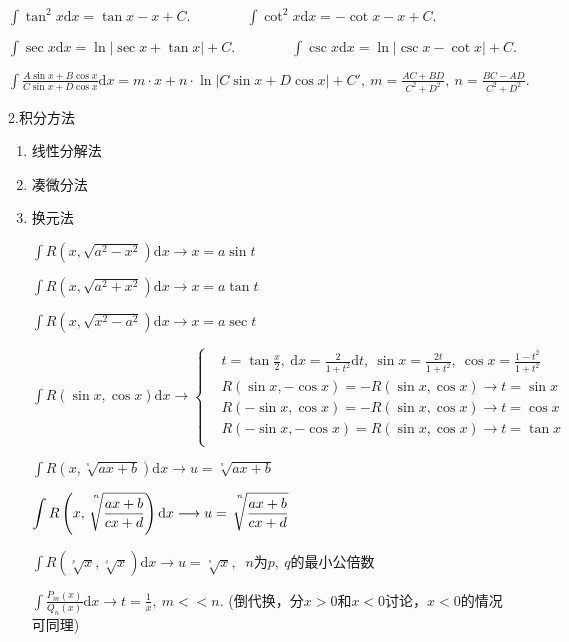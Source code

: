\documentclass[UTF8]{ctexart}
\newcommand\dif{\mathrm{d}}
\newcommand\no{\noindent}
\newcommand\dis{\displaystyle}
\newcommand\intd{\dis\int}
\begin{document}
\begin{spacing}{2}
\begin{spacing}{3}
$\intd\tan^2 x\dif x=\tan x-x+C.
\qquad\qquad
\intd\cot^2 x\dif x=-\cot x-x+C.$

$\intd \sec x\dif x=\ln|\sec x+\tan x|+C.
\qquad\qquad
\intd\csc x\dif x=\ln|\csc x-\cot x|+C.$

$\intd\frac{A\sin x+B\cos x}{C\sin x+D\cos x}\dif x
=m\cdot x+n\cdot \ln|C\sin x+D\cos x|+C',\ 
m=\frac{AC+BD}{C^2+D^2},\ n=\frac{BC-AD}{C^2+D^2}.$

\end{spacing}

\no2.积分方法

\begin{enumerate}[itemindent=1.4em, label=(\arabic*)]

\item 线性分解法

\item 凑微分法

\item 换元法

$\intd R(x,\sqrt{a^2-x^2})\dif x\longrightarrow x=a\sin t$

$\intd R(x,\sqrt{a^2+x^2})\dif x\longrightarrow x=a\tan t$

$\intd R(x,\sqrt{x^2-a^2})\dif x\longrightarrow x=a\sec t$

$\intd R(\sin x,\cos x)\dif x\longrightarrow 
\left\{\begin{aligned}
&t=\tan\frac{x}{2},\ 
\dif x=\frac{2}{1+t^2}\dif t,\ \sin x=\frac{2t}{1+t^2},\ 
\cos x=\frac{1-t^2}{1+t^2}\\
&R(\sin x,-\cos x)=-R(\sin x,\cos x)\longrightarrow t=\sin x\\
&R(-\sin x,\cos x)=-R(\sin x,\cos x)\longrightarrow t=\cos x\\
&R(-\sin x,-\cos x)=R(\sin x,\cos x)\longrightarrow t=\tan x\\
\end{aligned}\right.$

$\intd R\left(x,\sqrt[^n\!]{ax+b}\right)\dif x\longrightarrow u=\sqrt[^n\!]{ax+b}$

$\intd R\left(x,\sqrt[\leftroot{-3}\uproot{+16}n]
{\dfrac{ax+b}{cx+d}}\right)\dif x\longrightarrow 
u=\sqrt[\leftroot{-3}\uproot{+16}n]{\dfrac{ax+b}{cx+d}}$

$\intd R(\sqrt[^p\!]{x},\sqrt[^q\!]{x})\dif x\longrightarrow u=\sqrt[^n\!]{x},\ $
$n$为$p,\ q$的最小公倍数

$\intd\frac{P_m(x)}{Q_n(x)}\dif x\longrightarrow t=\frac{1}{x},\ m<<n.$
(倒代换，分$x>0$和$x<0$讨论，$x<0$的情况可同理)


\end{enumerate}
\end{spacing}
\end{document}
